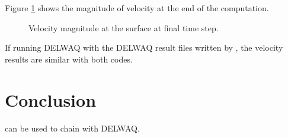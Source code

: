 Figure \ref{t3d:delwaq:Velo} shows the magnitude of velocity at the end of the
computation.

\begin{figure}[H]
  \centering
  \caption{Velocity magnitude at the surface at final time step.}
  \label{t3d:delwaq:Velo}
\end{figure}

If running DELWAQ with the DELWAQ result files written by , the
velocity results are similar with both codes.

\section{Conclusion}

 can be used to chain with DELWAQ.
